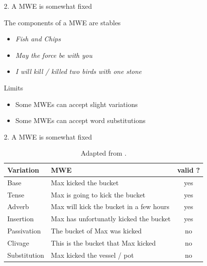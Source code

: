 \documentclass[serif, aspectratio=169]{beamer}
\begin{document}
\begin{frame}{2. A MWE is somewhat fixed}
    \begin{block}{The components of a MWE are stables}
        \begin{itemize}
            \item \textit{Fish and Chips}
            \item \textit{May the force be with you}
            \item \textit{I will kill / killed two birds with one stone}
        \end{itemize}
    \end{block}
    \vfill
    \pause
    \begin{block}{Limits}
       \begin{itemize}
        \item Some MWEs can accept slight variations
        \item Some MWEs can accept word substitutions
       \end{itemize} 
    \end{block}
\end{frame}

\begin{frame}{2. A MWE is somewhat fixed}
    \begin{table}
        \centering
        \renewcommand{\arraystretch}{1.5} 
        \begin{tabular}{|l|l|c|}
            \hline
            \textbf{Variation} & \textbf{MWE} & \textbf{valid ?} \\
            \hline
            Base         & Max kicked the bucket & yes \\
            \hline
            Tense        & Max is going to kick the bucket & yes \\
            \hline
            Adverb       & Max will kick the bucket in a few hours & yes \\
            \hline
            Insertion    & Max has unfortunatly kicked the bucket & yes \\
            \hline
            Passivation  & The bucket of Max was kicked & no \\
            \hline
            Clivage      & This is the bucket that Max kicked & no \\
            \hline
            Substitution & Max kicked the vessel / pot & no \\
            \hline
        \end{tabular}
        \caption*{Adapted from \citet{gross_classification_1982}.}
    \end{table}
\end{frame}
\end{document}
